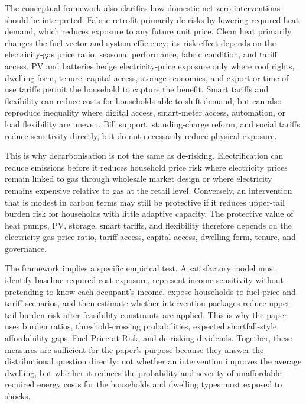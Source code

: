 The conceptual framework also clarifies how domestic net zero interventions should be interpreted. Fabric retrofit primarily de-risks by lowering required heat demand, which reduces exposure to any future unit price. Clean heat primarily changes the fuel vector and system efficiency; its risk effect depends on the electricity-gas price ratio, seasonal performance, fabric condition, and tariff access. PV and batteries hedge electricity-price exposure only where roof rights, dwelling form, tenure, capital access, storage economics, and export or time-of-use tariffs permit the household to capture the benefit. Smart tariffs and flexibility can reduce costs for households able to shift demand, but can also reproduce inequality where digital access, smart-meter access, automation, or load flexibility are uneven. Bill support, standing-charge reform, and social tariffs reduce sensitivity directly, but do not necessarily reduce physical exposure.

This is why decarbonisation is not the same as de-risking. Electrification can reduce emissions before it reduces household price risk where electricity prices remain linked to gas through wholesale market design or where electricity remains expensive relative to gas at the retail level. Conversely, an intervention that is modest in carbon terms may still be protective if it reduces upper-tail burden risk for households with little adaptive capacity. The protective value of heat pumps, PV, storage, smart tariffs, and flexibility therefore depends on the electricity-gas price ratio, tariff access, capital access, dwelling form, tenure, and governance.

The framework implies a specific empirical test. A satisfactory model must identify baseline required-cost exposure, represent income sensitivity without pretending to know each occupant's income, expose households to fuel-price and tariff scenarios, and then estimate whether intervention packages reduce upper-tail burden risk after feasibility constraints are applied. This is why the paper uses burden ratios, threshold-crossing probabilities, expected shortfall-style affordability gaps, Fuel Price-at-Risk, and de-risking dividends. Together, these measures are sufficient for the paper's purpose because they answer the distributional question directly: not whether an intervention improves the average dwelling, but whether it reduces the probability and severity of unaffordable required energy costs for the households and dwelling types most exposed to shocks.
